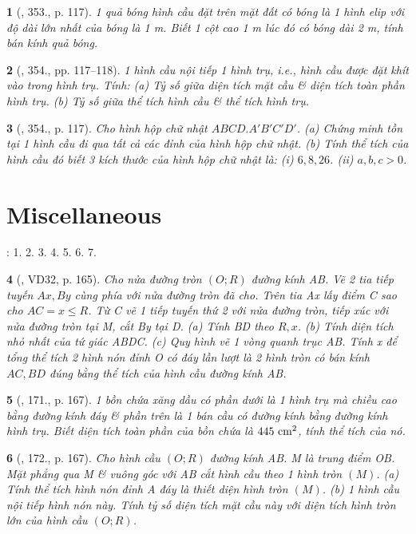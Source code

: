 \documentclass{article}
\newtheorem{baitoan}{}
\begin{document}
\begin{baitoan}[\cite{Binh_Toan_9_tap_2}, 353., p. 117]
	1 quả bóng hình cầu đặt trên mặt đất có bóng là 1 hình elip với độ dài lớn nhất của bóng là {\rm1 m}. Biết 1 cột cao {\rm1 m} lúc đó có bóng dài {\rm2 m}, tính bán kính quả bóng.
\end{baitoan}

\begin{baitoan}[\cite{Binh_Toan_9_tap_2}, 354., pp. 117--118]
	1 hình cầu nội tiếp 1 hình trụ, i.e., hình cầu được đặt khít vào trong hình trụ. Tính: (a) Tỷ số giữa diện tích mặt cầu \& diện tích toàn phần hình trụ. (b) Tỷ số giữa thể tích hình cầu \& thể tích hình trụ.
\end{baitoan}

\begin{baitoan}[\cite{Binh_Toan_9_tap_2}, 354., p. 117]
	Cho hình hộp chữ nhật $ABCD.A'B'C'D'$. (a) Chứng minh tồn tại 1 hình cầu đi qua tất cả các đỉnh của hình hộp chữ nhật. (b) Tính thể tích của hình cầu đó biết 3 kích thước của hình hộp chữ nhật là: (i) $6,8,26$. (ii) $a,b,c > 0$.
\end{baitoan}


\section{Miscellaneous}
\cite[BTCCX, pp. 109--110]{SGK_Toan_9_Canh_Dieu_tap_1}: 1. 2. 3. 4. 5. 6. 7.

\begin{baitoan}[\cite{Tuyen_Toan_9_old}, VD32, p. 165]
	Cho nửa đường tròn $(O;R)$ đường kính AB. Vẽ 2 tia tiếp tuyến $Ax,By$ cùng phía với nửa đường tròn đã cho. Trên tia Ax lấy điểm C sao cho $AC = x\le R$. Từ C vẽ 1 tiếp tuyến thứ 2 với nửa đường tròn, tiếp xúc với nửa đường tròn tại M, cắt By tại D. (a) Tính BD theo $R,x$. (b) Tính diện tích nhỏ nhất của tứ giác ABDC. (c) Quy hình vẽ 1 vòng quanh trục AB. Tính x để tổng thể tích 2 hình nón đỉnh O có đáy lần lượt là 2 hình tròn có bán kính $AC,BD$ đúng bằng thể tích của hình cầu đường kính AB.
\end{baitoan}

\begin{baitoan}[\cite{Tuyen_Toan_9_old}, 171., p. 167]
	1 bồn chứa xăng dầu có phần dưới là 1 hình trụ mà chiều cao bằng đường kính đáy \& phần trên là 1 bán cầu có đường kính bằng đường kính hình trụ. Biết diện tích toàn phần của bồn chứa là $445\ {\rm cm}^2$, tính thể tích của nó.
\end{baitoan}

\begin{baitoan}[\cite{Tuyen_Toan_9_old}, 172., p. 167]
	Cho hình cầu $(O;R)$ đường kính AB. M là trung điểm OB. Mặt phẳng qua M \& vuông góc với AB cắt hình cầu theo 1 hình tròn $(M)$. (a) Tính thể tích hình nón đỉnh A đáy là thiết diện hình tròn $(M)$. (b) 1 hình cầu nội tiếp hình nón này. Tính tỷ số diện tích mặt cầu này với diện tích hình tròn lớn của hình cầu $(O;R)$.
\end{baitoan}


\printbibliography[heading=bibintoc]
	
\end{document}
